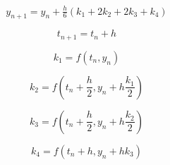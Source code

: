 \documentclass[10pt,a4paper,notitlepage]{report}
\begin{document}
\begin{equation}
y_{n+1} = y_n + \tfrac{h}{6}\left(k_1 + 2k_2 + 2k_3 + k_4 \right)
\end{equation}

\begin{equation}
t_{n+1} = t_n + h 
\end{equation}

\begin{equation}
k_1 = f(t_n, y_n)
\end{equation}

\begin{equation}
k_2 = f\left(t_n + \frac{h}{2}, y_n + h\frac{k_1}{2}\right)
\end{equation}

\begin{equation}
k_3 = f\left(t_n + \frac{h}{2}, y_n + h\frac{k_2}{2}\right)
\end{equation}

\begin{equation}
k_4 = f\left(t_n + h, y_n + hk_3\right)
\end{equation}
\end{document}
